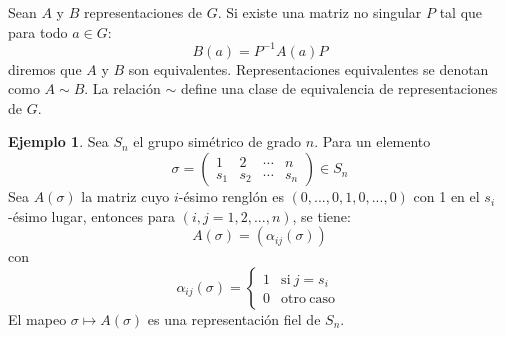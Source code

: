\documentclass[12pt]{book}
\theoremstyle{definition}
\newtheorem{example}[theorem]{Ejemplo}
\newcounter{in}
\begin{document}
Sean $A$ y $B$ representaciones de $G$. Si existe una
matriz no singular $P$ tal que para todo $a \in G$:
\begin{equation*}
  B\left(a\right)= P^{-1}A\left(a\right)P
\end{equation*}
diremos que $A$ y $B$ son equivalentes. Representaciones equivalentes
se denotan como $A \sim B$. La relación $\sim$
define una clase de equivalencia de representaciones de $G$.

\begin{example}
  \label{Ej3}
  Sea $S_{n}$ el grupo simétrico de grado
  $n$. Para un elemento
  \begin{equation}
    \label{eq:1}
    \sigma =
    \begin{pmatrix}
      1 & 2 & \cdots  & n\\
      s_{1} & s_{2} & \cdots & s_{n}
    \end{pmatrix} 
    \in S_{n}
  \end{equation}  
  Sea $A\left(\sigma\right)$ la matriz cuyo $i$-ésimo renglón es
  $\left(0,...,0,1,0,...,0\right)$ con 1 en el $s_{i}$-ésimo lugar,
  entonces para $\left(i,j=1,2,...,n\right)$, se tiene:
  \begin{equation*}
    A\left(\sigma\right) = \left(\alpha_{ij}\left(\sigma\right)\right) 
  \end{equation*}
  con
  \begin{equation*}
    \alpha_{ij}\left(\sigma\right) = \left\{
      \begin{array}{ll}
        1      & \mathrm{si\ } j = s_{i} \\
        0      & \mathrm{otro\ caso\ } 
      \end{array}
    \right.
  \end{equation*}
  El mapeo $\sigma \mapsto A\left(\sigma\right)$ es una representación
  fiel de $S_{n}$.
\end{example}
\end{document}
